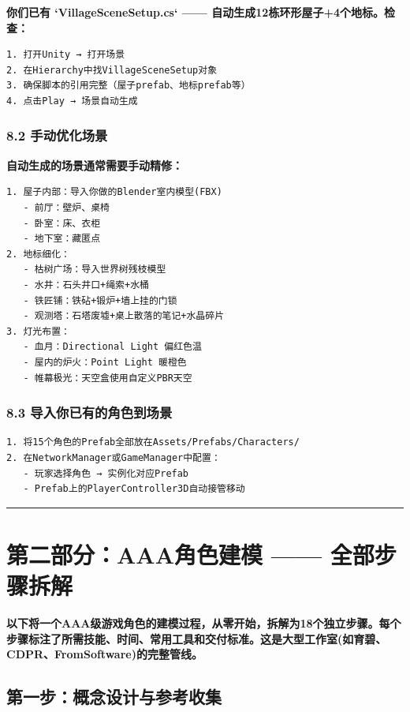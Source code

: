 \documentclass[12pt,a4paper,openany]{ctexbook}
\begin{document}
\textbf{你们已有 `VillageSceneSetup.cs` —— 自动生成12栋环形屋子+4个地标。检查：}


\begin{verbatim}
1. 打开Unity → 打开场景
2. 在Hierarchy中找VillageSceneSetup对象
3. 确保脚本的引用完整（屋子prefab、地标prefab等）
4. 点击Play → 场景自动生成
\end{verbatim}


\subsection*{8.2 手动优化场景}


\textbf{自动生成的场景通常需要手动精修：}


\begin{verbatim}
1. 屋子内部：导入你做的Blender室内模型(FBX)
   - 前厅：壁炉、桌椅
   - 卧室：床、衣柜
   - 地下室：藏匿点
2. 地标细化：
   - 枯树广场：导入世界树残枝模型
   - 水井：石头井口+绳索+水桶
   - 铁匠铺：铁砧+锻炉+墙上挂的门锁
   - 观测塔：石塔废墟+桌上散落的笔记+水晶碎片
3. 灯光布置：
   - 血月：Directional Light 偏红色温
   - 屋内的炉火：Point Light 暖橙色
   - 帷幕极光：天空盒使用自定义PBR天空
\end{verbatim}


\subsection*{8.3 导入你已有的角色到场景}


\begin{verbatim}
1. 将15个角色的Prefab全部放在Assets/Prefabs/Characters/
2. 在NetworkManager或GameManager中配置：
   - 玩家选择角色 → 实例化对应Prefab
   - Prefab上的PlayerController3D自动接管移动
\end{verbatim}


\bigskip\hrule\bigskip


\chapter{第二部分：AAA角色建模 —— 全部步骤拆解}


\textbf{以下将一个AAA级游戏角色的建模过程，从零开始，拆解为18个独立步骤。每个步骤标注了所需技能、时间、常用工具和交付标准。这是大型工作室(如育碧、CDPR、FromSoftware)的完整管线。}


\section*{第一步：概念设计与参考收集}
\end{document}
